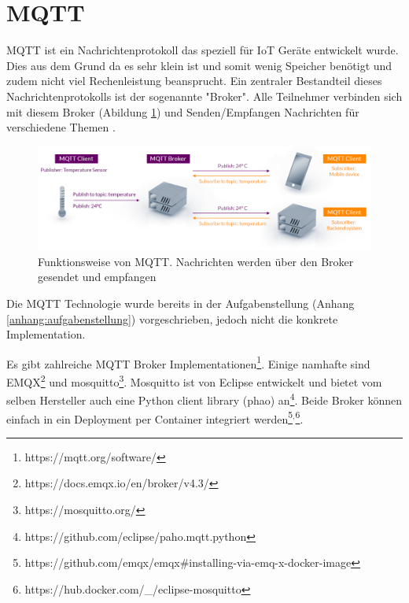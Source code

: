 
\section{MQTT} %
\label{state:mqtt}

\ac{MQTT} ist ein Nachrichtenprotokoll das speziell für \ac{IoT} Geräte entwickelt wurde.
Dies aus dem Grund da es sehr klein ist und somit wenig Speicher benötigt und zudem
nicht viel Rechenleistung beansprucht.
Ein zentraler Bestandteil dieses Nachrichtenprotokolls ist der sogenannte "Broker".
Alle Teilnehmer verbinden sich mit diesem Broker (Abildung \ref{fig:mqtt}) und Senden/Empfangen Nachrichten
für verschiedene Themen \parencite{mqtt}.

\begin{figure}[H]
    \centering
    \includegraphics[width=1.0\textwidth]{gfx/mqtt-publish-subscribe}
    \caption{
        Funktionsweise von \ac{MQTT}. Nachrichten werden über den Broker gesendet und empfangen \parencite{mqtt}
    }
    \label{fig:mqtt}
\end{figure}

Die \ac{MQTT} Technologie wurde bereits in der Aufgabenstellung (Anhang \ref{anhang:aufgabenstellung}) vorgeschrieben, jedoch
nicht die konkrete Implementation.

Es gibt zahlreiche \ac{MQTT} Broker Implementationen\footnote{https://mqtt.org/software/}.
Einige namhafte sind EMQX\footnote{https://docs.emqx.io/en/broker/v4.3/} und mosquitto\footnote{https://mosquitto.org/}.
Mosquitto ist von Eclipse entwickelt und bietet vom selben Hersteller auch eine
Python client library (phao) an\footnote{https://github.com/eclipse/paho.mqtt.python}.
Beide Broker können einfach in ein Deployment per Container integriert werden\footnote{https://github.com/emqx/emqx\#installing-via-emq-x-docker-image}$^{,}$\footnote{https://hub.docker.com/\_/eclipse-mosquitto}.

